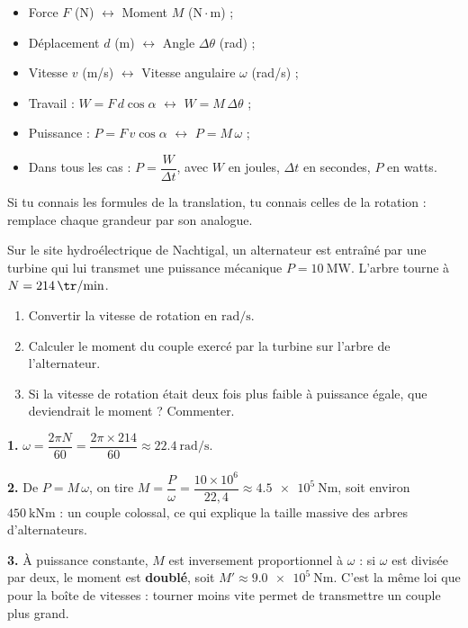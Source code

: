 \documentclass[11pt]{article}
\begin{document}
\begin{aretenir}
\begin{itemize}
\item Force $F$ (N) $\longleftrightarrow$ Moment $M$ ($\mathrm{N\cdot m}$) ;
\item Déplacement $d$ (m) $\longleftrightarrow$ Angle $\Delta\theta$ (rad) ;
\item Vitesse $v$ (m/s) $\longleftrightarrow$ Vitesse angulaire $\omega$ (rad/s) ;
\item Travail : $W = F\,d\cos\alpha$ $\longleftrightarrow$ $W = M\,\Delta\theta$ ;
\item Puissance : $P = F\,v\cos\alpha$ $\longleftrightarrow$ $P = M\,\omega$ ;
\item Dans tous les cas : $P = \dfrac{W}{\Delta t}$, avec $W$ en joules, $\Delta t$ en secondes, $P$ en watts.
\end{itemize}
Si tu connais les formules de la translation, tu connais celles de la rotation : remplace chaque grandeur par son analogue.
\end{aretenir}

\begin{exercice}
Sur le site hydroélectrique de Nachtigal, un alternateur est entraîné par une turbine qui lui transmet une puissance mécanique $P = \SI{10}{\mega\watt}$. L'arbre tourne à $N = \SI{214}{\tr\per\minute}$.
\begin{enumerate}
\item Convertir la vitesse de rotation en $\mathrm{rad/s}$.
\item Calculer le moment du couple exercé par la turbine sur l'arbre de l'alternateur.
\item Si la vitesse de rotation était deux fois plus faible à puissance égale, que deviendrait le moment ? Commenter.
\end{enumerate}
\end{exercice}

\begin{corrige}
\textbf{1.} $\omega = \dfrac{2\pi N}{60} = \dfrac{2\pi \times 214}{60} \approx \SI{22,4}{\radian\per\second}$.

\textbf{2.} De $P = M\,\omega$, on tire $M = \dfrac{P}{\omega} = \dfrac{10\times 10^{6}}{22,4} \approx \SI{4,5e5}{\newton\meter}$, soit environ $\SI{450}{\kilo\newton\meter}$ : un couple colossal, ce qui explique la taille massive des arbres d'alternateurs.

\textbf{3.} À puissance constante, $M$ est inversement proportionnel à $\omega$ : si $\omega$ est divisée par deux, le moment est \textbf{doublé}, soit $M' \approx \SI{9,0e5}{\newton\meter}$. C'est la même loi que pour la boîte de vitesses : tourner moins vite permet de transmettre un couple plus grand.
\end{corrige}
\end{document}
